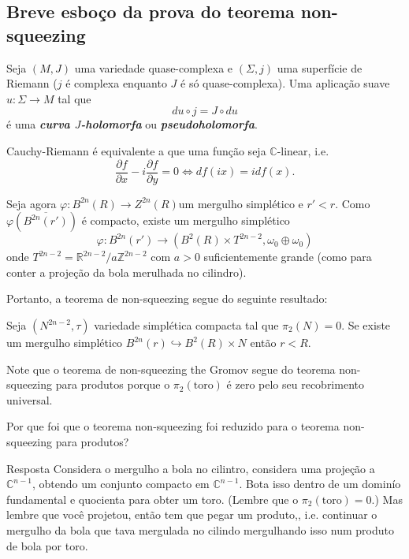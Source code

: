 \subsection{Breve esboço da prova do teorema non-squeezing}

\begin{defn}\leavevmode
Seja $(M,J)$ uma variedade quase-complexa e $(\Sigma, j)$ uma superfície de Riemann ($j$ é complexa enquanto $J$ é só quase-complexa). Uma aplicação suave $u:\Sigma\to M$ tal que
\[du\circ j=J\circ du\]
é uma \textit{\textbf{curva $J$-holomorfa}} ou \textit{\textbf{pseudoholomorfa}}.
\end{defn}

\begin{remark}\leavevmode
	Cauchy-Riemann é equivalente a que uma função seja $\mathbb{C}$-linear, i.e.
	\[\frac{\partial f}{\partial x}-i\frac{\partial f}{\partial y}=0\iff df(ix)=idf(x).\]
\end{remark}

Seja agora $\varphi:B^{2n}(R)\longrightarrow Z^{2n}(R)$um mergulho simplético e  $r'<r$. Como $\varphi\left( \overline{B^{2n}(r')} \right) $ é compacto, existe um mergulho simplético
\[\varphi:B^{2n}(r')\longrightarrow\left( B^2(R)\times T^{2n-2},\omega_0 \oplus  \omega_0 \right) \]
onde $T^{2n-2}=\mathbb{R}^{2n-2}/a\mathbb{Z}^{2n-2}$ com $a>0$ suficientemente grande  {\color{3}(como para conter a projeção da bola merulhada no cilindro)}.

Portanto, a teorema de non-squeezing segue do seguinte resultado:

\begin{thm}\leavevmode
Seja $(N^{2n-2},\tau)$ variedade simplética compacta tal que $\pi_{2}(N)=0$. Se existe um mergulho simplético $B^{2n}(r)\hookrightarrow B^2(R)\times N$ então $r<R$.
\end{thm}

Note que o teorema de non-squeezing the Gromov segue do teorema non-squeezing para produtos porque o $\pi_{2}(\text{toro} )$ é zero pelo seu recobrimento universal.

\begin{question}\leavevmode
	Por que foi que o teorema non-squeezing foi reduzido para o teorema non-squeezing para produtos?
\end{question}

\begin{thing4}{Resposta}\leavevmode
Considera o mergulho a bola no cilintro, considera uma projeção a $\mathbb{C}^{n-1}$, obtendo um conjunto compacto em $\mathbb{C}^{n-1}$. Bota isso dentro de um dominío fundamental e quocienta para obter um toro. (Lembre que o $\pi_{2}(\text{toro} )=0$.) Mas lembre que você projetou, então tem que pegar um produto,, i.e. continuar o mergulho da bola que tava mergulada no cilindo mergulhando isso num produto de bola por toro.
\end{thing4}

